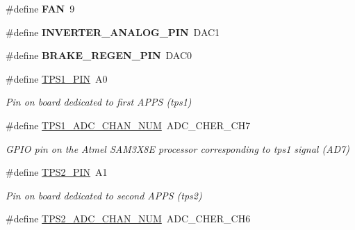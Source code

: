 \begin{DoxyCompactItemize}
\#define {\bfseries F\+AN}~9
\item 
\mbox{\label{group___board__model__group_gad6c9e9b63f53c664772ee858436e0ae9}} 
\#define {\bfseries I\+N\+V\+E\+R\+T\+E\+R\+\_\+\+A\+N\+A\+L\+O\+G\+\_\+\+P\+IN}~D\+A\+C1
\item 
\mbox{\label{group___board__model__group_ga604c7f4c9fe74f1d9877071bbee1c9e0}} 
\#define {\bfseries B\+R\+A\+K\+E\+\_\+\+R\+E\+G\+E\+N\+\_\+\+P\+IN}~D\+A\+C0
\item 
\mbox{\label{group___board__model__group_gae9aa914854f611488701c96a330b0bd4}} 
\#define \mbox{\hyperlink{group___board__model__group_gae9aa914854f611488701c96a330b0bd4}{T\+P\+S1\+\_\+\+P\+IN}}~A0
\begin{DoxyCompactList}\small\item\em Pin on board dedicated to first A\+P\+PS (tps1) \end{DoxyCompactList}\item 
\mbox{\label{group___board__model__group_ga99b2a7dadaf495e3c559a46440f9141f}} 
\#define \mbox{\hyperlink{group___board__model__group_ga99b2a7dadaf495e3c559a46440f9141f}{T\+P\+S1\+\_\+\+A\+D\+C\+\_\+\+C\+H\+A\+N\+\_\+\+N\+UM}}~A\+D\+C\+\_\+\+C\+H\+E\+R\+\_\+\+C\+H7
\begin{DoxyCompactList}\small\item\em G\+P\+IO pin on the Atmel S\+A\+M3\+X8E processor corresponding to tps1 signal (A\+D7) \end{DoxyCompactList}\item 
\mbox{\label{group___board__model__group_gab13a816bae3ca994897fc6f1cb590a67}} 
\#define \mbox{\hyperlink{group___board__model__group_gab13a816bae3ca994897fc6f1cb590a67}{T\+P\+S2\+\_\+\+P\+IN}}~A1
\begin{DoxyCompactList}\small\item\em Pin on board dedicated to second A\+P\+PS (tps2) \end{DoxyCompactList}\item 
\mbox{\label{group___board__model__group_ga4cecb8c10512873904099a1a88d69ed3}} 
\#define \mbox{\hyperlink{group___board__model__group_ga4cecb8c10512873904099a1a88d69ed3}{T\+P\+S2\+\_\+\+A\+D\+C\+\_\+\+C\+H\+A\+N\+\_\+\+N\+UM}}~A\+D\+C\+\_\+\+C\+H\+E\+R\+\_\+\+C\+H6

\end{DoxyCompactItemize}
